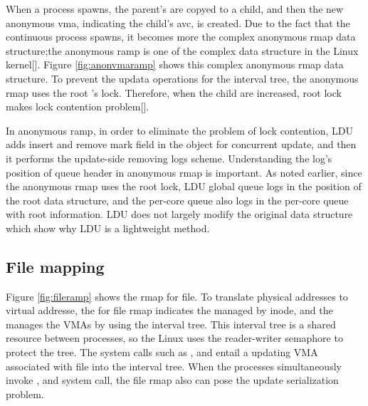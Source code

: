When a process spawns, the parent's  are copyed
to a child, and then the new anonymous vma, indicating the child's avc, is
created.
Due to the fact that the continuous process spawns, it becomes more the complex
anonymous rmap data structure;the anonymous ramp is one of the complex data
structure in the Linux kernel[].
Figure \ref{fig:anonvmaramp} shows this complex anonymous rmap data
structure.
To prevent the updata operations for the interval tree, the anonymous rmap
uses the root 's lock. 
Therefore, when the child  are increased, root lock makes lock
contention problem[].

In anonymous ramp, in order to eliminate the problem of lock contention, LDU
adds insert and remove mark field in the  object for concurrent
update, and then it performs the update-side removing logs scheme.
Understanding the log's position of queue header in anonymous rmap is important.
As noted earlier, since the anonymous rmap uses the root lock, LDU global
queue logs in the position of the root data structure, and the per-core queue
also logs in the per-core queue with root information.
LDU does not largely modify the original data structure which show why LDU is a
lightweight method.

\subsection{File mapping}

Figure \ref{fig:fileramp} shows the rmap for file.
To translate physical addresses to virtual addresse, the  for
file rmap indicates the  managed by inode, and
the  manages the VMAs by using the interval tree.
This interval tree is a shared resource between processes, so the Linux uses the
reader-writer semaphore to protect the tree.
The system calls such as ,  and  entail
a updating VMA associated with file into the interval tree.
When the processes simultaneously invoke ,  and
 system call, the file rmap also can pose the update serialization
problem.

